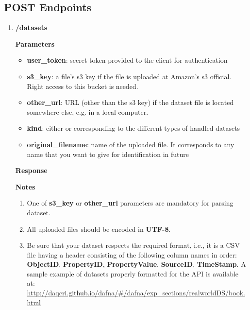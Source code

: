 \documentclass[a4paper,10pt]{scrartcl}
\begin{document}
\subsection{POST Endpoints}
\begin{enumerate}
 \item \textbf{/datasets}
\textbf{Parameters}
\begin{itemize}
\item \textbf{user\_token}: secret token provided to the client for authentication 
\item \textbf{s3\_key}: a file's s3 key if the file is uploaded at Amazon's s3 official. Right access to this bucket 
is needed.
\item \textbf{other\_url}: URL (other than the s3 key) if the dataset file is located somewhere else, e.g. in a local computer.
\item \textbf{kind}: either  or  corresponding to the different types of handled datasets
\item \textbf{original\_filename}: name of the uploaded file. It corresponds to any name that you want to give for identification
in future
\end{itemize}
\textbf{Response}
\textbf{Notes}
\begin{enumerate}
 \item One of \textbf{s3\_key} or \textbf{other\_url} parameters are mandatory for parsing dataset. 
 \item All uploaded files should be encoded in \textbf{UTF-8}.
 \item Be sure that your dataset respects the required format, i.e., it is a CSV file 
 having a header consisting of the following column names in order: \textbf{ObjectID},
 \textbf{PropertyID}, \textbf{PropertyValue}, \textbf{SourceID}, \textbf{TimeStamp}. 
 A sample example of datasets properly formatted for the API is available at:
 \href{http://daqcri.github.io/dafna/\#/dafna/exp\_sections/realworldDS/book.html}{\small{http://daqcri.github.io/dafna/\#/dafna/exp\_sections/realworldDS/book.html}}

\end{enumerate}
\end{enumerate}
\end{document}
